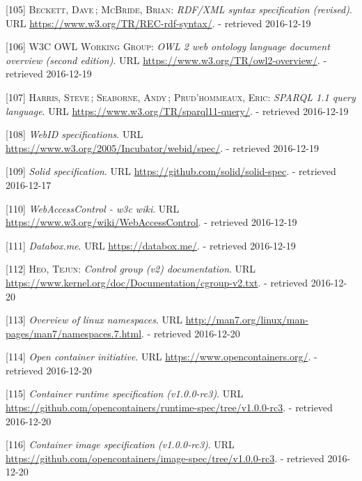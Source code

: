 \documentclass[12pt,english,a4paper,titlepage,cleardoublepage=empty,dottedtoc]{report}
\begin{document}
\hypertarget{ref-web_w3c-tr_rdf}{}
{[}105{]} \textsc{Beckett, Dave}\,; \textsc{McBride, Brian}:
\emph{RDF/XML syntax specification (revised)}. URL
\url{https://www.w3.org/TR/REC-rdf-syntax/}. - retrieved 2016-12-19

\hypertarget{ref-web_w3c-tr_owl}{}
{[}106{]} \textsc{W3C OWL Working Group}: \emph{OWL 2 web ontology
language document overview (second edition)}. URL
\url{https://www.w3.org/TR/owl2-overview/}. - retrieved 2016-12-19

\hypertarget{ref-web_w3c-tr_sparql}{}
{[}107{]} \textsc{Harris, Steve}\,; \textsc{Seaborne, Andy}\,;
\textsc{Prud'hommeaux, Eric}: \emph{SPARQL 1.1 query language}. URL
\url{https://www.w3.org/TR/sparql11-query/}. - retrieved 2016-12-19

\hypertarget{ref-web_w3c-draft_webid}{}
{[}108{]} \emph{WebID specifications}. URL
\url{https://www.w3.org/2005/Incubator/webid/spec/}. - retrieved
2016-12-19

\hypertarget{ref-web_spec_solid}{}
{[}109{]} \emph{Solid specification}. URL
\url{https://github.com/solid/solid-spec}. - retrieved 2016-12-17

\hypertarget{ref-web_2016_wiki_webaccesscontrol}{}
{[}110{]} \emph{WebAccessControl - w3c wiki}. URL
\url{https://www.w3.org/wiki/WebAccessControl}. - retrieved 2016-12-19

\hypertarget{ref-web_2016_demo_databox}{}
{[}111{]} \emph{Databox.me}. URL \url{https://databox.me/}. - retrieved
2016-12-19

\hypertarget{ref-web_2015_cgroup-doc}{}
{[}112{]} \textsc{Heo, Tejun}: \emph{Control group (v2) documentation}.
URL \url{https://www.kernel.org/doc/Documentation/cgroup-v2.txt}. -
retrieved 2016-12-20

\hypertarget{ref-web_2016_kernel-namespace}{}
{[}113{]} \emph{Overview of linux namespaces}. URL
\url{http://man7.org/linux/man-pages/man7/namespaces.7.html}. -
retrieved 2016-12-20

\hypertarget{ref-web_2016_open-container-initiative}{}
{[}114{]} \emph{Open container initiative}. URL
\url{https://www.opencontainers.org/}. - retrieved 2016-12-20

\hypertarget{ref-web_oci-spec_runtime}{}
{[}115{]} \emph{Container runtime specification (v1.0.0-rc3)}. URL
\url{https://github.com/opencontainers/runtime-spec/tree/v1.0.0-rc3}. -
retrieved 2016-12-20

\hypertarget{ref-web_oci-spec_image}{}
{[}116{]} \emph{Container image specification (v1.0.0-rc3)}. URL
\url{https://github.com/opencontainers/image-spec/tree/v1.0.0-rc3}. -
retrieved 2016-12-20
\end{document}
